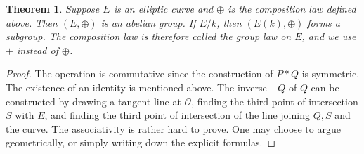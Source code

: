 \documentclass[12pt]{article}
\newtheorem{theorem}{Theorem}[subsection]
\theoremstyle{remark}
\theoremstyle{definition}
\begin{document}
        \begin{theorem}
            Suppose $E$ is an elliptic curve and $\oplus$ is the composition law defined above. Then $(E,\oplus)$ is an abelian group. If $E/k$, then $(E(k),\oplus)$ forms a subgroup. The composition law is therefore called the \textit{group law on $E$}, and we use $+$ instead of $\oplus$.
        \end{theorem}
        \begin{proof}
            The operation is commutative since the construction of $P*Q$ is symmetric. The existence of an identity is mentioned above. The inverse $-Q$ of $Q$ can be constructed by drawing a tangent line at $\mathcal{O}$, finding the third point of intersection $S$ with $E$, and finding the third point of intersection of the line joining $Q, S$ and the curve. The associativity is rather hard to prove. One may choose to argue geometrically, or simply writing down the explicit formulas.
        \end{proof}
        
\end{document}
